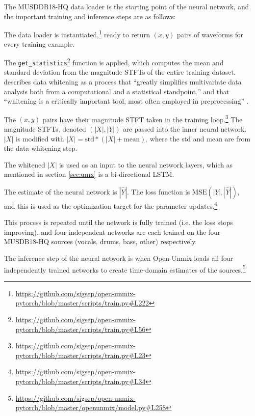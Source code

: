 \documentclass[report.tex]{subfiles}
\begin{document}
The MUSDDB18-HQ data loader is the starting point of the neural network, and the important training and inference steps are as follows:

\begin{tight_enumerate}
	\item
		The data loader is instantiated,\footnote{\url{https://github.com/sigsep/open-unmix-pytorch/blob/master/scripts/train.py\#L222}} ready to return $(x, y)$ pairs of waveforms for every training example.
	\item
		The \Verb#get_statistics#\footnote{\url{https://github.com/sigsep/open-unmix-pytorch/blob/master/scripts/train.py\#L56}} function is applied, which computes the mean and standard deviation from the magnitude STFTs of the entire training dataset. \citeauthor{Kessy_2018} describes data whitening as a process that ``greatly simplifies multivariate data analysis both from a computational and a statistical standpoint,'' and that ``whitening is a critically important tool, most often employed in preprocessing'' \parencite[309]{Kessy_2018}.
	\item
		The $(x, y)$ pairs have their magnitude STFT taken in the training loop.\footnote{\url{https://github.com/sigsep/open-unmix-pytorch/blob/master/scripts/train.py\#L23}} The magnitude STFTs, denoted $(|X|, |Y|)$ are passed into the inner neural network. $|X|$ is modified with $|X| = \text{std}*(|X|+\text{mean})$, where the std and mean are from the data whitening step.
	\item
		The whitened $|X|$ is used as an input to the neural network layers, which as mentioned in section \ref{sec:umx} is a bi-directional LSTM.
	\item
		The estimate of the neural network is $|\hat{Y}|$. The loss function is $\text{MSE}(|Y|, |\hat{Y}|)$, and this is used as the optimization target for the parameter updates.\footnote{\url{https://github.com/sigsep/open-unmix-pytorch/blob/master/scripts/train.py\#L34}}
	\item
		This process is repeated until the network is fully trained (i.e. the loss stops improving), and four independent networks are each trained on the four MUSDB18-HQ sources (vocals, drums, bass, other) respectively.
	\item
		The inference step of the neural network is when Open-Unmix loads all four independently trained networks to create time-domain estimates of the sources.\footnote{\url{https://github.com/sigsep/open-unmix-pytorch/blob/master/openunmix/model.py\#L258}}
	\item

\end{tight_enumerate}
\end{document}
